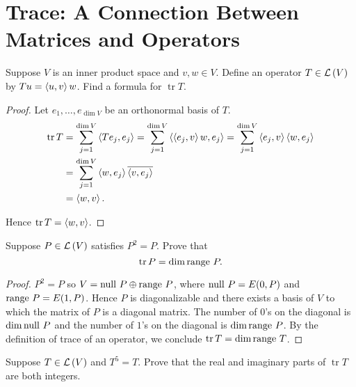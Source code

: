 \section{Trace: A Connection Between Matrices and Operators}

\begin{exercise}\label{chapter8:sectionD:exercise1}
    Suppose $V$ is an inner product space and $v, w\in V$. Define an operator $T\in\mathcal{L}\left({V}\right)$ by $Tu = \left\langle{u, v}\right\rangle w$. Find a formula for $\operatorname{tr}T$.
\end{exercise}

\begin{proof}
    Let $e_{1}, \ldots, e_{\dim V}$ be an orthonormal basis of $T$.
    \begin{align*}
        \operatorname{tr}T & = \sum^{\dim V}_{j=1}\left\langle{Te_{j}, e_{j}}\right\rangle = \sum^{\dim V}_{j=1}\left\langle{\left\langle{e_{j}, v}\right\rangle w, e_{j}}\right\rangle = \sum^{\dim V}_{j=1}\left\langle{e_{j}, v}\right\rangle\left\langle{w, e_{j}}\right\rangle \\
                           & = \sum^{\dim V}_{j=1}\left\langle{w, e_{j}}\right\rangle\overline{\left\langle{v, e_{j}}\right\rangle}                                                                                                       \\
                           & = \left\langle{w, v}\right\rangle.
    \end{align*}

    Hence $\operatorname{tr}T = \left\langle{w, v}\right\rangle$.
\end{proof}
\newpage

\begin{exercise}\label{chapter8:sectionD:exercise2}
    Suppose $P\in\mathcal{L}\left({V}\right)$ satisfies $P^{2} = P$. Prove that
    \[
        \operatorname{tr} P = \dim\operatorname{range}\,{P}.
    \]
\end{exercise}

\begin{proof}
    $P^{2} = P$ so $V = \operatorname{null}\,{P}\oplus \operatorname{range}\,{P}$, where $\operatorname{null}\,{P} = E(0, P)$ and $\operatorname{range}\,{P} = E(1, P)$. Hence $P$ is diagonalizable and there exists a basis of $V$ to which the matrix of $P$ is a diagonal matrix. The number of $0$'s on the diagonal is $\dim\operatorname{null}\,{P}$ and the number of $1$'s on the diagonal is $\dim\operatorname{range}\,{P}$. By the definition of trace of an operator, we conclude $\operatorname{tr}T = \dim\operatorname{range}\,{T}$.
\end{proof}
\newpage

\begin{exercise}\label{chapter8:sectionD:exercise3}
    Suppose $T\in\mathcal{L}\left({V}\right)$ and $T^{5} = T$. Prove that the real and imaginary parts of $\operatorname{tr} T$ are both integers.
\end{exercise}

